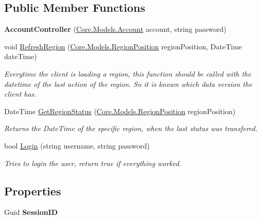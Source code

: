 \subsection*{Public Member Functions}
\begin{DoxyCompactItemize}
\item 
\hypertarget{classServer_1_1Controllers_1_1AccountController_ac35adf7e9f6d20dfbf584df2723b320c}{{\bfseries Account\-Controller} (\hyperlink{classCore_1_1Models_1_1Account}{Core.\-Models.\-Account} account, string password)}\label{classServer_1_1Controllers_1_1AccountController_ac35adf7e9f6d20dfbf584df2723b320c}

\item 
void \hyperlink{classServer_1_1Controllers_1_1AccountController_a2326ec6c25856d4dcf65d9422b753c97}{Refresh\-Region} (\hyperlink{classCore_1_1Models_1_1RegionPosition}{Core.\-Models.\-Region\-Position} region\-Position, Date\-Time date\-Time)
\begin{DoxyCompactList}\small\item\em Everytime the client is loading a region, this function should be called with the datetime of the last action of the region. So it is known which data version the client has. \end{DoxyCompactList}\item 
Date\-Time \hyperlink{classServer_1_1Controllers_1_1AccountController_ae318dc148368d8a293c7fdf6dabceab6}{Get\-Region\-Status} (\hyperlink{classCore_1_1Models_1_1RegionPosition}{Core.\-Models.\-Region\-Position} region\-Position)
\begin{DoxyCompactList}\small\item\em Returns the Date\-Time of the specific region, when the last status was transfered. \end{DoxyCompactList}\item 
bool \hyperlink{classServer_1_1Controllers_1_1AccountController_a73d7223e39a37a1adfb3b04ab7513031}{Login} (string username, string password)
\begin{DoxyCompactList}\small\item\em Tries to login the user, return true if everything worked. \end{DoxyCompactList}\end{DoxyCompactItemize}
\subsection*{Properties}
\begin{DoxyCompactItemize}
\item 
\hypertarget{classServer_1_1Controllers_1_1AccountController_a243d08e18b7e88f0ed33f3283aaf5709}{Guid {\bfseries Session\-I\-D}}\label{classServer_1_1Controllers_1_1AccountController_a243d08e18b7e88f0ed33f3283aaf5709}

\end{DoxyCompactItemize}


